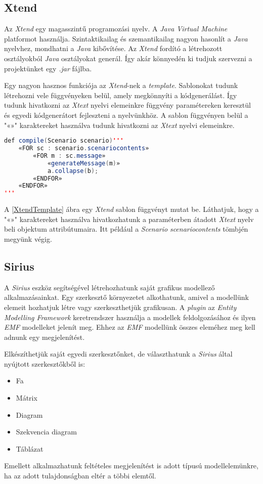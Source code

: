 \subsection{Xtend}

Az \textit{Xtend} \cite{Xtend} egy magasszintű programozási nyelv.
A \textit{Java Virtual Machine} platformot használja.
Szintaktikailag és szemantikailag nagyon hasonlít a \textit{Java} nyelvhez, mondhatni a \textit{Java} kibővítése.
Az \textit{Xtend} fordító a létrehozott osztályokból \textit{Java} osztályokat generál.
Így akár könnyedén ki tudjuk szervezni a projektünket egy \textit{.jar} fájlba.

Egy nagyon hasznos funkciója az \textit{Xtend}-nek a \textit{template}.
Sablonokat tudunk létrehozni vele függvényeken belül, amely megkönnyíti a kódgenerálást.
Így tudunk hivatkozni az \textit{Xtext} nyelvi elemeinkre függvény paramétereken keresztül és egyedi kódgenerátort fejleszteni a nyelvünkhöz.
A sablon függvényen belül a "«»" karaktereket használva tudunk hivatkozni az \textit{Xtext} nyelvi elemeinkre.

\begin{lstlisting}[language=java, frame=single, float=ht!, caption={Xtend template.},captionpos=b, label=XtendTemplate]
def compile(Scenario scenario)'''
	«FOR sc : scenario.scenariocontents»
		«FOR m : sc.message»
			«generateMessage(m)»
			a.collapse(b);
		«ENDFOR»
	«ENDFOR»
'''
\end{lstlisting}

A \ref{XtendTemplate} ábra egy \textit{Xtend} sablon függvényt mutat be.
Láthatjuk, hogy a "«»" karaktereket használva hivatkozhatunk a paraméterben átadott \textit{Xtext} nyelv beli objektum attribútumaira.
Itt például a \textit{Scenario} \textit{scenariocontents} tömbjén megyünk végig.

\subsection{Sirius}

A \textit{Sirius} \cite{Sirius} eszköz segítségével létrehozhatunk saját grafikus modellező alkalmazásainkat.
Egy szerkesztő környezetet alkothatunk, amivel a modellünk elemeit hozhatjuk létre vagy szerkeszthetjük grafikusan.
A \textit{plugin} az \textit{Entity Modelling Framework} \cite{EMF} keretrendszer használja a modellek feldolgozásához és ilyen \textit{EMF} modelleket jelenít meg.
Ehhez az \textit{EMF} modellünk összes eleméhez meg kell adnunk egy megjelenítést.

Elkészíthetjük saját egyedi szerkesztőnket, de választhatunk a \textit{Sirius} által nyújtott szerkesztőkből is:
\begin{itemize}
	\item Fa
	\item Mátrix
	\item Diagram
	\item Szekvencia diagram
	\item Táblázat
\end{itemize}

Emellett alkalmazhatunk feltételes megjelenítést is adott típusú modellelemünkre, ha az adott tulajdonságban eltér a többi elemtől.